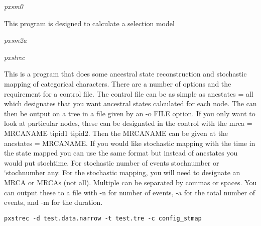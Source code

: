 \documentclass[12pt,letterpaper]{article}
\renewcommand{\subsection}[1]{%
\bigskip
\begin{center}
\begin{large}
\normalfont\itshape #1
\end{large}
\end{center}}
\begin{document}
\subsection{pxsm0}

This program is designed to calculate a selection model

\subsection{pxsm2a}

\subsection{pxstrec}

This is a program that does some ancestral state reconstruction and stochastic mapping of categorical characters. There are a number of options and the requirement for a control file. The control file can be as simple as ancstates = all which designates that you want ancestral states calculated for each node. The can then be output on a tree in a file given by an -o FILE option. If you only want to look at particular nodes, these can be designated in the control with the mrca = MRCANAME tipid1 tipid2. Then the MRCANAME can be given at the ancstates = MRCANAME. If you would like stochastic mapping with the time in the state mapped you can use the same format but instead of ancstates you would put stochtime. For stochastic number of events stochnumber or `stochnumber any. For the stochastic mapping, you will need to designate an MRCA or MRCAs (not all). Multiple can be separated by commas or spaces. You can output these to a file with -n for number of events, -a for the total number of events, and -m for the duration. 

\begin{flushleft}
\begin{verbatim}
pxstrec -d test.data.narrow -t test.tre -c config_stmap
\end{verbatim}
\end{flushleft}
\end{document}
